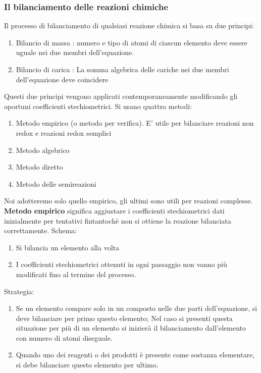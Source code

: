\documentclass{article}
\begin{document}
\subsubsection{Il bilanciamento delle reazioni chimiche}
Il processo di bilanciamento di qualsiasi reazione chimica si basa su due principi:
\begin{enumerate}
    \item Bilancio di massa : numero e tipo di atomi di ciascun elemento deve essere uguale nei due membri dell'equazione.
    \item Bilancio di carica : La somma algebrica delle cariche nei due membri dell'equazione deve coincidere
\end{enumerate}
Questi due principi vengono applicati contemporaneamente modificando gli oportuni coefficienti stechiometrici. Si usano quattro metodi:
\begin{enumerate}
    \item Metodo empirico (o metodo per verifica). E' utile per bilanciare reazioni non redox e reazioni redox semplici
    \item Metodo algebrico
    \item Metodo diretto
    \item Metodo delle semireazioni
\end{enumerate}
Noi adotteremo solo quello empirico, gli ultimi sono utili per reazioni complesse.\\
\textbf{Metodo empirico} significa aggiustare i coefficienti stechiometrici dati inizialmente per tentativi
fintantochè non si ottiene la reazione bilanciata correttamente.
Schema:
\begin{enumerate}
    \item Si bilancia un elemento alla volta
    \item I coefficienti stechiometrici ottenuti in ogni passaggio non vanno più modificati fino al termine del processo.
\end{enumerate}
Strategia:
\begin{enumerate}
    \item Se un elemento compare solo in un composto nelle due parti dell'equazione, si deve bilanciare per primo questo elemento; 
        Nel caso si presenti questa situazione per più di un elemento si inizierà il bilanciamento dall'elemento con numero di atomi diseguale.
    \item Quando uno dei reagenti o dei prodotti è presente come sostanza elementare, si debe bilanciare questo elemento per ultimo.
\end{enumerate}
\end{document}
